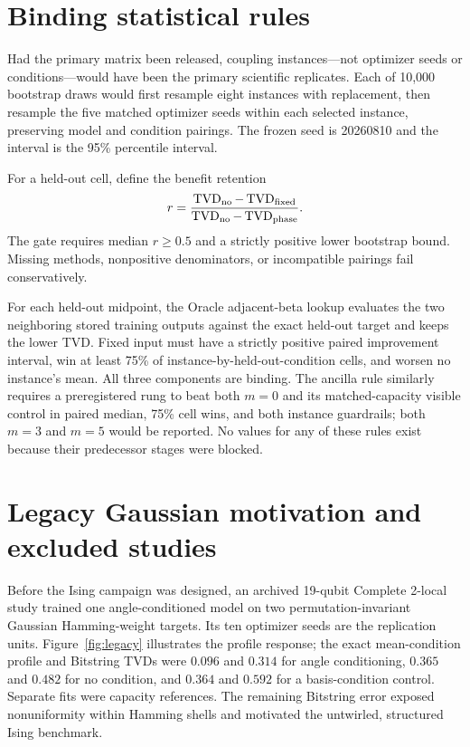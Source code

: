 \section{Binding statistical rules}
\label{app:statistics}

Had the primary matrix been released, coupling instances—not optimizer seeds
or conditions—would have been the primary scientific replicates.  Each of
10,000 bootstrap draws would first resample eight instances with replacement,
then resample the five matched optimizer seeds within each selected instance,
preserving model and condition pairings.  The frozen seed is 20260810 and the
interval is the 95\% percentile interval.

For a held-out cell, define the benefit retention
\begin{equation}
 r=\frac{\operatorname{TVD}_{\mathrm{no}}-\operatorname{TVD}_{\mathrm{fixed}}}
 {\operatorname{TVD}_{\mathrm{no}}-\operatorname{TVD}_{\mathrm{phase}}}.
\end{equation}
The gate requires median $r\geq0.5$ and a strictly positive lower bootstrap
bound.  Missing methods, nonpositive denominators, or incompatible pairings
fail conservatively.

For each held-out midpoint, the Oracle adjacent-beta lookup evaluates the two
neighboring stored training outputs against the exact held-out target and
keeps the lower TVD.  Fixed input must have a strictly positive paired
improvement interval, win at least 75\% of instance-by-held-out-condition
cells, and worsen no instance's mean.  All three components are binding.  The
ancilla rule similarly requires a preregistered rung to beat both $m=0$ and its
matched-capacity visible control in paired median, 75\% cell wins, and both
instance guardrails; both $m=3$ and $m=5$ would be reported.  No values for any
of these rules exist because their predecessor stages were blocked.

\section{Legacy Gaussian motivation and excluded studies}
\label{app:legacy}

Before the Ising campaign was designed, an archived 19-qubit Complete 2-local
study trained one angle-conditioned model on two permutation-invariant
Gaussian Hamming-weight targets.  Its ten optimizer seeds are the replication
units.  Figure~\ref{fig:legacy} illustrates the profile response; the exact
mean-condition profile and Bitstring TVDs were $0.096$ and $0.314$ for angle
conditioning, $0.365$ and $0.482$ for no condition, and $0.364$ and $0.592$ for
a basis-condition control.  Separate fits were capacity references.  The
remaining Bitstring error exposed nonuniformity within Hamming shells and
motivated the untwirled, structured Ising benchmark.

